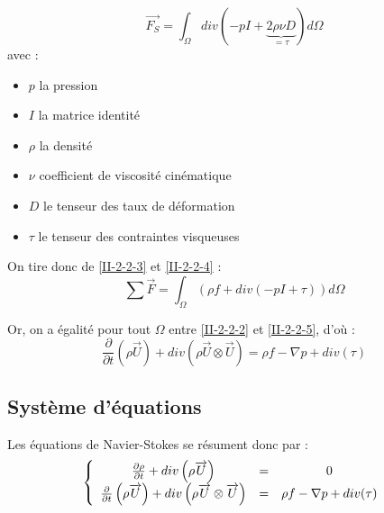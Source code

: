 \begin{equation} \label{II-2-2-4} \overrightarrow{F_S}=\int_{\Omega} div\left( -pI+\underbrace{2\rho\nu D}_{=\tau}\right) d\Omega \end{equation}
avec :
\begin{itemize}
	\item $p$ la pression
	\item $I$ la matrice identité
	\item $\rho$ la densité
	\item $\nu$ coefficient de viscosité cinématique
	\item $D$ le tenseur des taux de déformation
	\item $\tau$ le tenseur des contraintes visqueuses
\end{itemize}

\bigskip
On tire donc de \ref{II-2-2-3} et \ref{II-2-2-4} :
\begin{equation}\label{II-2-2-5} \sum \overrightarrow{F}= \int_{\Omega} \left( \rho f + div\left( -pI+\tau\right) \right)d\Omega\end{equation}

Or, on a égalité pour tout $\Omega$ entre \ref{II-2-2-2} et \ref{II-2-2-5}, d'où :
\begin{equation} \label{II-2-2-6} \frac{\partial}{\partial t} \left( \rho \overrightarrow{U} \right) + div\left( \rho \overrightarrow{U} \otimes \overrightarrow{U}\right) = \rho f -\nabla p + div(\tau) \end{equation}

	\subsection{Système d'équations}
Les équations de Navier-Stokes se résument donc par :
\[\left\{ \begin{array}{c c c}
	\frac{\partial \rho}{\partial t} + div\left(\rho \overrightarrow{U}\right)&=&0\\
	\frac{\partial}{\partial t} \left( \rho \overrightarrow{U} \right) + div\left( \rho \overrightarrow{U} \otimes \overrightarrow{U}\right) &=& \rho f -\nabla p + div(\tau)
\end{array}\right.\]

